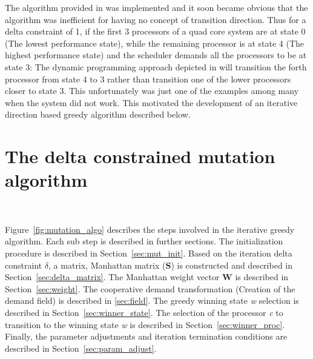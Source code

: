 The algorithm provided in \cite{mckp} was implemented and it soon became obvious 
that the algorithm was inefficient for having no concept of transition direction. Thus for 
a delta constraint of 1, if 
the first 3 processors of a quad core system are at state 0 (The lowest performance state),
while the remaining processor is at state 4 (The highest performance state) and the scheduler
demands all the processors to be at state 3: The dynamic programming approach depicted in
\cite{mckp} will transition the forth processor from state 4 to 3 rather than transition 
one of the lower processors closer to state 3. This unfortunately was just one of the examples
among many when the system did not work. This motivated the development of an iterative 
direction based greedy algorithm described below.


\section{The delta constrained mutation algorithm}~\label{sec:delta_algo}

Figure~\ref{fig:mutation_algo} describes the steps involved in the iterative greedy algorithm. 
Each sub step is described in further sections. The initialization procedure is described in Section~\ref{sec:mut_init}.
Based on the iteration delta constraint $\delta$, a matrix, Manhattan
matrix (\textbf{S}) is constructed and described in Section~\ref{sec:delta_matrix}.
The Manhattan weight vector \textbf{W} is described in Section~\ref{sec:weight}.
The cooperative demand transformation (Creation of the demand field) is described in
\ref{sec:field}. The greedy winning state \textit{w} selection is described in Section~\ref{sec:winner_state}.
The selection of the processor \textit{c} to transition to the winning state \textit{w} 
is described in Section~\ref{sec:winner_proc}. Finally, the parameter adjustments and iteration
termination conditions are described in Section~\ref{sec:param_adjust}. 

